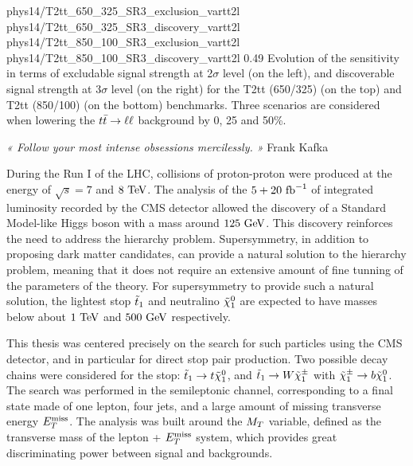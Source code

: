                          {phys14/T2tt_650_325_SR3_exclusion_vartt2l}
                         {phys14/T2tt_650_325_SR3_discovery_vartt2l}
                         {phys14/T2tt_850_100_SR3_exclusion_vartt2l}
                         {phys14/T2tt_850_100_SR3_discovery_vartt2l}
                         {0.49}
                         {Evolution of the sensitivity in terms of excludable signal strength
                         at 2$\sigma$ level (on the left), and discoverable signal strength
                         at 3$\sigma$ level (on the right) for the T2tt (650/325) (on the top)
                         and T2tt (850/100) (on the bottom) benchmarks. Three scenarios are
                         considered when lowering the $t\bar{t} \rightarrow \ell \ell$ background by 0, 25 and 50\%.}

\vspace*{-1cm}
\hspace*{0.37\textwidth}
\begin{minipage}{0.62\textwidth}
\emph{« Follow your most intense obsessions mercilessly. »}
\hspace*{0.6\textwidth} Frank Kafka
\end{minipage}

\vspace*{1.5cm}

During the Run I of the LHC, collisions of proton-proton were produced at the
energy of $\sqrt{s} = 7$ and $8~\text{TeV}$. The analysis of the $5+20~\text{fb}^{-1}$ of integrated luminosity
recorded by the CMS detector allowed the discovery of a Standard Model-like Higgs boson
with a mass around $125~\text{GeV}$. This discovery reinforces the need to address the hierarchy
problem. Supersymmetry, in addition to proposing dark matter candidates, can provide a natural
solution to the hierarchy problem, meaning that it does not require an extensive amount of fine
tunning of the parameters of the theory. For supersymmetry to provide such a natural solution,
the lightest stop $\tilde{t}_1$ and neutralino $\tilde{\chi}_1^0$ are expected to have masses below about
$1~\text{TeV}$ and $500~\text{GeV}$ respectively.

This thesis was centered precisely on the search for such particles using the CMS detector, and
in particular for direct stop pair production. Two possible decay chains were considered for the stop:
$\tilde{t}_1 \rightarrow t \tilde{\chi}_1^0$, and $\tilde{t}_1 \rightarrow W \tilde{\chi}_1^\pm$ with $\tilde{\chi}_1^\pm
\rightarrow b \tilde{\chi}_1^0$. The search was performed in the semileptonic channel, corresponding
to a final state made of one lepton, four jets, and a large amount of missing transverse energy
$E_T^\text{miss}$. The analysis was built around the $M_T$ variable, defined as the transverse mass of the lepton + $E_T^\text{miss}$
system, which provides great discriminating power between signal and backgrounds.

